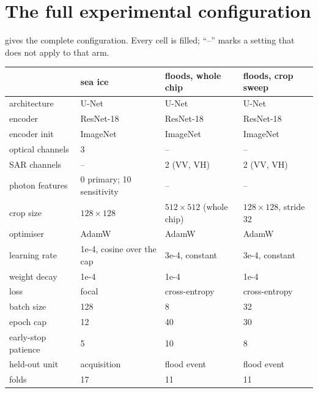 \documentclass[10pt,twocolumn,letterpaper]{article}
\begin{document}


\section{The full experimental configuration}

 gives the complete configuration. Every cell is filled; ``--''
marks a setting that does not apply to that arm.

\begin{table}[t]
\centering
\footnotesize
\setlength{\tabcolsep}{5pt}
\begin{tabular}{llll}
\toprule
 & \textbf{sea ice} & \textbf{floods, whole chip} & \textbf{floods, crop sweep} \\
\midrule
architecture       & U-Net~\cite{ronneberger2015unet} & U-Net & U-Net \\
encoder            & ResNet-18~\cite{he2016deep} & ResNet-18 & ResNet-18 \\
encoder init       & ImageNet~\cite{deng2009imagenet} & ImageNet & ImageNet \\
optical channels   & 3                    & --                   & -- \\
SAR channels       & --                   & 2 (VV, VH)           & 2 (VV, VH) \\
photon features    & 0 primary; 10 sensitivity & --            & -- \\
crop size          & $128 \times 128$     & $512 \times 512$ (whole chip) & $128 \times 128$, stride 32 \\
\midrule
optimiser          & AdamW~\cite{loshchilov2019decoupled} & AdamW & AdamW \\
learning rate      & 1e-4, cosine over the cap & 3e-4, constant & 3e-4, constant \\
weight decay       & 1e-4                 & 1e-4                 & 1e-4 \\
loss               & focal~\cite{lin2017focal} & cross-entropy & cross-entropy \\
batch size         & 128                  & 8                    & 32 \\
epoch cap          & 12                   & 40                   & 30 \\
early-stop patience & 5                   & 10                   & 8 \\
\midrule
held-out unit      & acquisition          & flood event          & flood event \\
folds              & 17                   & 11                   & 11 \\

\end{tabular}
\end{table}
\end{document}
